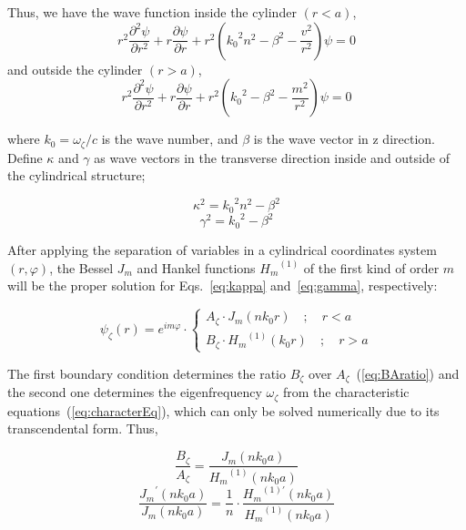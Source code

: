 Thus, we have the wave function inside the cylinder $(r<a)$,
\begin{equation}
  {r^2}\frac{{\partial}^2\psi}{\partial{r^2}}+r\frac{\partial\psi}{\partial{r}}+r^2({k_0}^2n^2-\beta^2-\frac{v^2}{r^2})\psi = 0
\end{equation}
and outside the cylinder $(r>a)$,
\begin{equation}
  {r^2}\frac{{\partial}^2\psi}{\partial{r^2}}+r\frac{\partial\psi}{\partial{r}}+r^2({k_0}^2-\beta^2-\frac{m^2}{r^2})\psi = 0
\end{equation}

where $k_0=\omega_\zeta/c$ is the wave number, and $\beta$ is the wave vector
in z direction. Define $\kappa$ and $\gamma$ as wave vectors in the transverse
direction inside and outside of the cylindrical structure;

\begin{equation}
  \kappa^2={k_0}^2n^2-\beta^2
  \label{eq:kappa}
\end{equation}
\begin{equation}
  \gamma^2={k_0}^2-\beta^2
  \label{eq:gamma}
\end{equation}

After applying the separation of variables in a cylindrical coordinates system
$(r,\varphi)$, the Bessel $J_m$ and Hankel functions ${H_m}^{(1)}$ of the first
kind of order $m$ will be the proper solution for Eqs.~\ref{eq:kappa}
and~\ref{eq:gamma}, respectively:

\begin{equation}
  \psi_\zeta(r)=e^{im\varphi}\cdot\left\{
    \begin{array}{ll}
      A_\zeta\cdot{J_m}(nk_0r)\quad;\quad r<a\\
      B_\zeta\cdot{H_m}^{(1)}(k_0r)\quad;\quad r>a
    \end{array}
    \right.
\end{equation}

The first boundary condition determines the ratio $B_\zeta$ over
$A_\zeta$~(\ref{eq:BAratio}) and the second one determines the eigenfrequency
$\omega_\zeta$ from the characteristic equations~(\ref{eq:characterEq}), which
can only be solved numerically due to its transcendental form. Thus,

\begin{equation}
  \frac{B_\zeta}{A_\zeta}=\frac{J_m(nk_0a)}{{H_m}^{(1)}(nk_0a)}
  \label{eq:BAratio}
\end{equation}
\begin{equation}
  \frac{{J_m}^\prime(nk_0a)}{{J_m}(nk_0a)}=\frac{1}{n}\cdot\frac{{H_m}^{(1)\prime}(nk_0a)}{{H_m}^{(1)}(nk_0a)}
  \label{eq:characterEq}
\end{equation}

